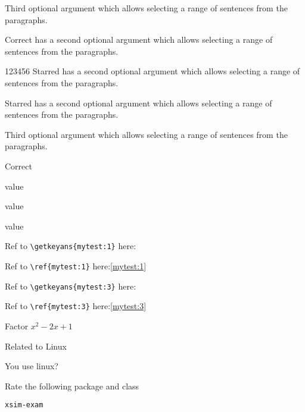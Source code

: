\documentclass{article}
\begin{document}
\begin{enumext}[nosep,align=center,save-ans=mytest,show-ans,check-ans=true,save-ref,widest=99,]
\item Third optional argument
which allows selecting a range of sentences from the paragraphs.

\begin{keyans}[itemindent=0.5cm,columns=1]
  \item*[L] Correct has a second optional argument
which allows selecting a range of sentences from the paragraphs.


  \item[123456] Starred has a second optional argument
which allows selecting a range of sentences from the paragraphs.
  \item Starred has a second optional argument
which allows selecting a range of sentences from the paragraphs.
\end{keyans}

\item Third optional argument
which allows selecting a range of sentences from the paragraphs.

\begin{keyans}[itemindent=0.5cm,columns=2]
  \item*[K] Correct
  \item value
  \item value
  \item value
\end{keyans}

\end{enumext}

Ref to \verb+\getkeyans{mytest:1}+ here:\par
Ref to \verb+\ref{mytest:1}+ here:\ref{mytest:1}\par
Ref to \verb+\getkeyans{mytest:3}+ here:\par
Ref to \verb+\ref{mytest:3}+ here:\ref{mytest:3}


\newpage

\begin{enumext*}[save-ans=simplews,columns=2,check-ans=true,show-pos,nosep,save-ref]
  \item Factor $x^{2}-2x+1$ 
  \item Related to Linux
    \begin{enumext}[nosep,columns*=2]
      \item You use linux? 
      \item Rate the following package and class
        \begin{enumext}[nosep]
          \item \texttt{xsim-exam} 
        \end{enumext}
    \end{enumext}
\end{enumext*}
\end{document}
